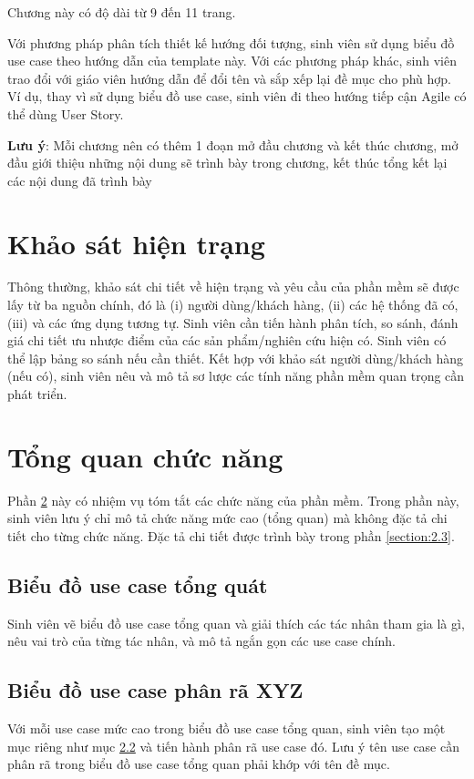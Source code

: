 \documentclass[../DoAn.tex]{subfiles}
\begin{document}
Chương này có độ dài từ 9 đến 11 trang.

Với phương pháp phân tích thiết kế hướng đối tượng, sinh viên sử dụng biểu đồ use case theo hướng dẫn của template này. Với các phương pháp khác, sinh viên trao đổi với giáo viên hướng dẫn để đổi tên và sắp xếp lại đề mục cho phù hợp. Ví dụ, thay vì sử dụng biểu đồ use case, sinh viên đi theo hướng tiếp cận Agile có thể dùng User Story.


\textbf{Lưu ý}: Mỗi chương nên có thêm 1 đoạn mở đầu chương và kết thúc chương, mở đầu giới thiệu những nội dung sẽ trình bày trong chương, kết thúc tổng kết lại các nội dung đã trình bày

\section{Khảo sát hiện trạng}
\label{section:2.1}
Thông thường, khảo sát chi tiết về hiện trạng và yêu cầu của phần mềm sẽ được lấy từ ba nguồn chính, đó là (i) người dùng/khách hàng, (ii) các hệ thống đã có, (iii) và các ứng dụng tương tự.
Sinh viên cần tiến hành phân tích, so sánh, đánh giá chi tiết ưu nhược điểm của các sản phẩm/nghiên cứu hiện có. Sinh viên có thể lập bảng so sánh nếu cần thiết. Kết hợp với khảo sát người dùng/khách hàng (nếu có), sinh viên nêu và mô tả sơ lược các tính năng phần mềm quan trọng cần phát triển.

\section{Tổng quan chức năng}
\label{section:2.2}
Phần \ref{section:2.2} này có nhiệm vụ tóm tắt các chức năng của phần mềm. Trong phần này, sinh viên lưu ý chỉ mô tả chức năng mức cao (tổng quan) mà không đặc tả chi tiết cho từng chức năng. Đặc tả chi tiết được trình bày trong phần \ref{section:2.3}.

\subsection{Biểu đồ use case tổng quát}
\label{subsection:2.2.1}
Sinh viên vẽ biểu đồ use case tổng quan và giải thích các tác nhân tham gia là gì, nêu vai trò của từng tác nhân, và mô tả ngắn gọn các use case chính.

\subsection{Biểu đồ use case phân rã XYZ}
\label{subsection:2.2.2}
Với mỗi use case mức cao trong biểu đồ use case tổng quan, sinh viên tạo một mục riêng như mục \ref{subsection:2.2.2} và tiến hành phân rã use case đó. Lưu ý tên use case cần phân rã trong biểu đồ use case tổng quan phải khớp với tên đề mục.
\end{document}
